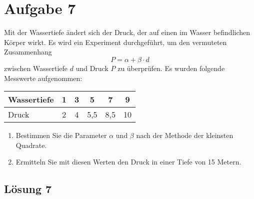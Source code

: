 \documentclass[main.tex]{subfiles}
\begin{document}
\section{Aufgabe 7}
Mit der Wassertiefe ändert sich der Druck, der auf einen im Wasser befindlichen Körper wirkt. 
Es wird ein Experiment durchgeführt, um den vermuteten Zusammenhang 
$$
    P = \alpha+\beta\cdot d
$$
zwischen Wassertiefe $d$ und Druck $P$ zu überprüfen. Es wurden folgende Messwerte aufgenommen:

\begin{center}
	\begin{tabular}{l|ccccc}
		Wassertiefe & 1 & 3 & 5 & 7 & 9\\
		\hline
		Druck       & 2 & 4 & 5,5 & 8,5 & 10
	\end{tabular}	
\end{center}
\begin{enumerate}
	\item Bestimmen Sie die Parameter $\alpha$ und $\beta$ nach der Methode der kleinsten Quadrate.
	\item Ermitteln Sie mit diesen Werten den Druck in einer Tiefe von 15 Metern.
\end{enumerate}

\subsection{Lösung 7}
\end{document}

